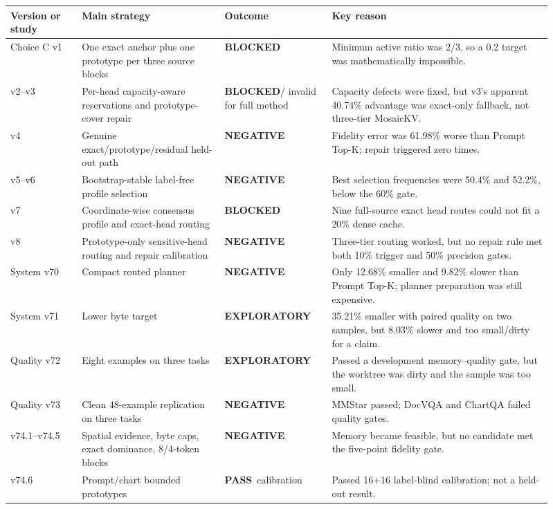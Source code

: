 \documentclass[11pt]{article}
\newcommand{\pass}{\textcolor{mkgreen}{\textbf{PASS}}}
\newcommand{\blocked}{\textcolor{mkorange}{\textbf{BLOCKED}}}
\newcommand{\explore}{\textcolor{mkpurple}{\textbf{EXPLORATORY}}}
\newcommand{\negative}{\textcolor{mkred}{\textbf{NEGATIVE}}}
\begin{document}
\begin{longtable}{p{0.12\linewidth}p{0.24\linewidth}p{0.18\linewidth}p{0.37\linewidth}}
\toprule
Version or study & Main strategy & Outcome & Key reason \\
\midrule
\endhead
Choice C v1 & One exact anchor plus one prototype per three source blocks & \blocked & Minimum
active ratio was $2/3$, so a 0.2 target was mathematically impossible. \\
v2--v3 & Per-head capacity-aware reservations and prototype-cover repair & \blocked / invalid for
full method & Capacity defects were fixed, but v3's apparent 40.74\% advantage was exact-only
fallback, not three-tier MosaicKV. \\
v4 & Genuine exact/prototype/residual held-out path & \negative & Fidelity error was 61.98\% worse
than Prompt Top-K; repair triggered zero times. \\
v5--v6 & Bootstrap-stable label-free profile selection & \negative & Best selection frequencies
were 50.4\% and 52.2\%, below the 60\% gate. \\
v7 & Coordinate-wise consensus profile and exact-head routing & \blocked & Nine full-source exact
head routes could not fit a 20\% dense cache. \\
v8 & Prototype-only sensitive-head routing and repair calibration & \negative & Three-tier routing
worked, but no repair rule met both 10\% trigger and 50\% precision gates. \\
System v70 & Compact routed planner & \negative & Only 12.68\% smaller and 9.82\% slower than Prompt
Top-K; planner preparation was still expensive. \\
System v71 & Lower byte target & \explore & 35.21\% smaller with paired quality on two samples, but
8.03\% slower and too small/dirty for a claim. \\
Quality v72 & Eight examples on three tasks & \explore & Passed a development memory--quality gate,
but the worktree was dirty and the sample was too small. \\
Quality v73 & Clean 48-example replication on three tasks & \negative & MMStar passed; DocVQA and
ChartQA failed quality gates. \\
v74.1--v74.5 & Spatial evidence, byte caps, exact dominance, 8/4-token blocks & \negative & Memory
became feasible, but no candidate met the five-point fidelity gate. \\
v74.6 & Prompt/chart bounded prototypes & \pass\ calibration & Passed 16+16 label-blind calibration;
not a held-out result. \\

\end{longtable}
\end{document}
